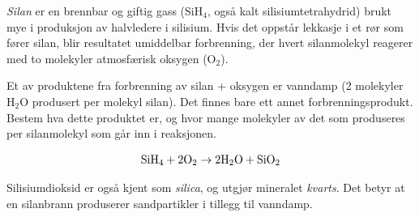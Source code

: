 

{\it Silan} er en brennbar og giftig gass (SiH$_{4}$, også kalt silisiumtetrahydrid) brukt mye i produksjon av halvledere i silisium. Hvis det oppstår lekkasje i et rør som fører silan, blir resultatet umiddelbar forbrenning, der hvert silanmolekyl reagerer med to molekyler atmosfærisk oksygen (O$_{2}$).

Et av produktene fra forbrenning av silan + oksygen er vanndamp (2 molekyler H$_{2}$O produsert per molekyl silan). Det finnes bare ett annet forbrenningsprodukt. Bestem hva dette produktet er, og hvor mange molekyler av det som produseres per silanmolekyl som går inn i reaksjonen.







$$\hbox{SiH}_4 + 2\hbox{O}_2 \to 2\hbox{H}_2\hbox{O} + \hbox{SiO}_2$$

Silisiumdioksid er også kjent som {\it silica}, og utgjør mineralet {\it kvarts}. Det betyr at en silanbrann produserer sandpartikler i tillegg til vanndamp.











